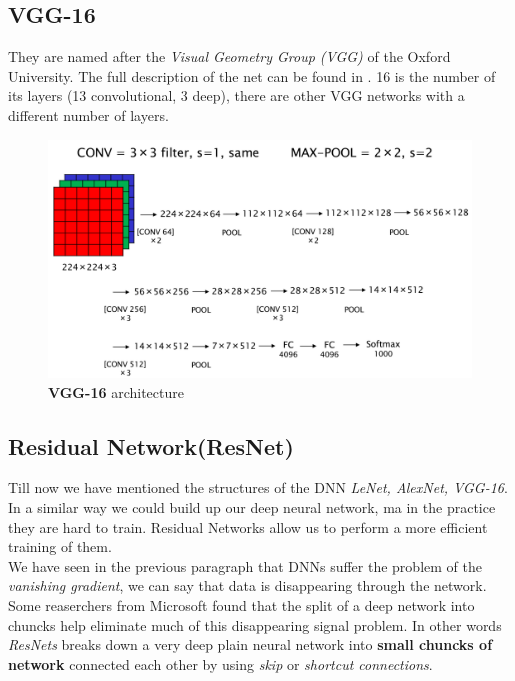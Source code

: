 \subsection{VGG-16}
They are named after the \textit{Visual Geometry Group (VGG)} of the Oxford University. The full description of the net can be found in \cite{VGG-16}. 16 is the number of its layers (13 convolutional, 3 deep), there are other VGG networks with a different number of layers.

\begin{figure}[h]
    \centering 
    \includegraphics[scale=0.5]{img/VGG16.png}
    \caption{\textbf{VGG-16} architecture}
\end{figure}

\subsection{Residual Network(ResNet)}
Till now we have mentioned the structures of the DNN \textit{LeNet, AlexNet, VGG-16}. In a similar way we could build up our deep neural network, ma in the practice they are hard to train. Residual Networks allow us to perform a more efficient training of them. \\
We have seen in the previous paragraph that DNNs suffer the problem of the \textit{vanishing gradient}, we can say that data is disappearing through the network. Some reaserchers from Microsoft found that the split of a deep network into chuncks help eliminate much of this disappearing signal problem. In other words \textit{ResNets} breaks down  a very deep plain neural network into \textbf{small chuncks of network} connected each other by using \textit{skip} or \textit{shortcut connections}.


